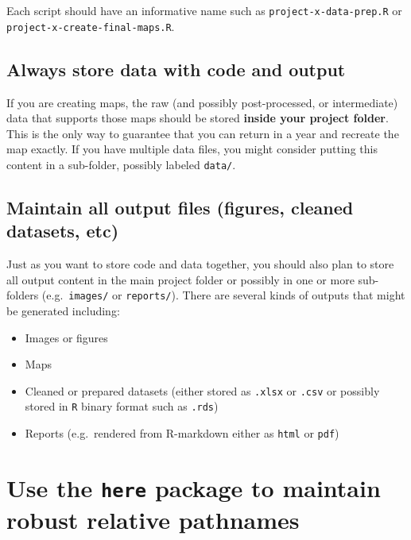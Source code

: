 \documentclass[
]{book}
\providecommand{\tightlist}{%
  \setlength{\itemsep}{0pt}\setlength{\parskip}{0pt}}
\begin{document}
Each script should have an informative name such as \texttt{project-x-data-prep.R} or \texttt{project-x-create-final-maps.R}.

\hypertarget{always-store-data-with-code-and-output}{%
\subsection{Always store data with code and output}\label{always-store-data-with-code-and-output}}

If you are creating maps, the raw (and possibly post-processed, or intermediate) data that supports those maps should be stored \textbf{inside your project folder}. This is the only way to guarantee that you can return in a year and recreate the map exactly. If you have multiple data files, you might consider putting this content in a sub-folder, possibly labeled \texttt{data/}.

\hypertarget{maintain-all-output-files-figures-cleaned-datasets-etc}{%
\subsection{Maintain all output files (figures, cleaned datasets, etc)}\label{maintain-all-output-files-figures-cleaned-datasets-etc}}

Just as you want to store code and data together, you should also plan to store all output content in the main project folder or possibly in one or more sub-folders (e.g.~\texttt{images/} or \texttt{reports/}). There are several kinds of outputs that might be generated including:

\begin{itemize}
\tightlist
\item
  Images or figures
\item
  Maps
\item
  Cleaned or prepared datasets (either stored as \texttt{.xlsx} or \texttt{.csv} or possibly stored in \texttt{R} binary format such as \texttt{.rds})
\item
  Reports (e.g.~rendered from R-markdown either as \texttt{html} or \texttt{pdf})
\end{itemize}

\hypertarget{use-the-here-package-to-maintain-robust-relative-pathnames}{%
\section{\texorpdfstring{Use the \texttt{here} package to maintain robust relative pathnames}{Use the here package to maintain robust relative pathnames}}\label{use-the-here-package-to-maintain-robust-relative-pathnames}}
\end{document}
